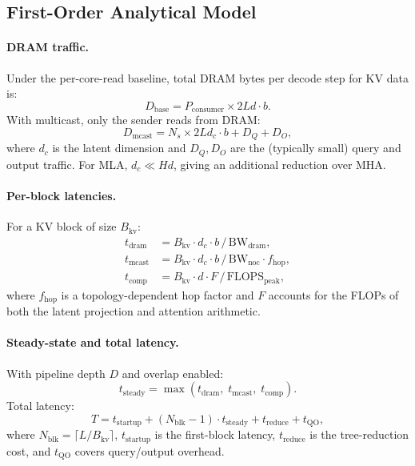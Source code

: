 \documentclass[sigconf, review, anonymous]{acmart}
\newcommand{\Bkv}{B_{\mathrm{kv}}}
\begin{document}

\subsection{First-Order Analytical Model}\label{sec:cm-first}

\paragraph{DRAM traffic.}
Under the per-core-read baseline, total DRAM bytes per decode step
for KV data is:
\begin{equation}\label{eq:dram-baseline}
  D_{\mathrm{base}} = P_{\mathrm{consumer}} \times 2Ld \cdot b .
\end{equation}
With multicast, only the sender reads from DRAM:
\begin{equation}\label{eq:dram-mcast}
  D_{\mathrm{mcast}} = N_s \times 2Ld_c \cdot b + D_Q + D_O ,
\end{equation}
where $d_c$ is the latent dimension and $D_Q, D_O$ are the
(typically small) query and output traffic.  For MLA,
$d_c \ll Hd$, giving an additional reduction over MHA.

\paragraph{Per-block latencies.}
For a KV block of size $\Bkv$:
\begin{align}
  t_{\mathrm{dram}}  &= \Bkv \cdot d_c \cdot b \,/\, \mathrm{BW}_{\mathrm{dram}} , \\
  t_{\mathrm{mcast}} &= \Bkv \cdot d_c \cdot b \,/\, \mathrm{BW}_{\mathrm{noc}}
                        \cdot f_{\mathrm{hop}} , \\
  t_{\mathrm{comp}}  &= \Bkv \cdot d \cdot F \,/\, \mathrm{FLOPS}_{\mathrm{peak}} ,
\end{align}
where $f_{\mathrm{hop}}$ is a topology-dependent hop factor and
$F$ accounts for the FLOPs of both the latent projection and
attention arithmetic.

\paragraph{Steady-state and total latency.}
With pipeline depth $D$ and overlap enabled:
\begin{equation}\label{eq:steady}
  t_{\mathrm{steady}} = \max(t_{\mathrm{dram}},\; t_{\mathrm{mcast}},\;
    t_{\mathrm{comp}}) .
\end{equation}
Total latency:
\begin{equation}\label{eq:total-lat}
  T = t_{\mathrm{startup}} + (N_{\mathrm{blk}} - 1) \cdot t_{\mathrm{steady}}
    + t_{\mathrm{reduce}} + t_{\mathrm{QO}} ,
\end{equation}
where $N_{\mathrm{blk}} = \lceil L / \Bkv \rceil$, $t_{\mathrm{startup}}$
is the first-block latency, $t_{\mathrm{reduce}}$ is the tree-reduction
cost, and $t_{\mathrm{QO}}$ covers query/output overhead.
\end{document}
